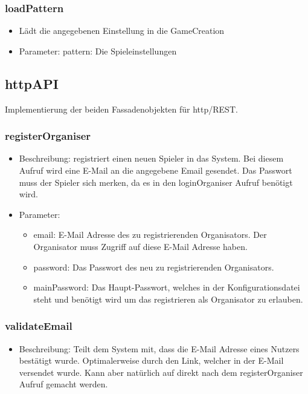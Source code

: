 \documentclass[a4paper]{scrreprt}
\begin{document}
	\subsubsection{loadPattern}
	\begin{itemize}
	\item Lädt die angegebenen Einstellung in die GameCreation
	\item Parameter: pattern: Die Spieleinstellungen
	\end{itemize}
	
   
    \subsection{httpAPI}
    Implementierung der beiden Fassadenobjekten für http/REST.

	\subsubsection{registerOrganiser}
	\begin{itemize}
		\item Beschreibung: registriert einen neuen Spieler in das System. Bei diesem Aufruf wird eine E-Mail an die angegebene Email gesendet. Das Passwort muss der Spieler sich merken, da es in den loginOrganiser Aufruf benötigt wird.
		\item Parameter:
		\begin{itemize}
			\item email: E-Mail Adresse des zu registrierenden Organisators. Der Organisator muss Zugriff auf diese E-Mail Adresse haben.
			\item password: Das Passwort des neu zu registrierenden Organisators.
			\item mainPassword: Das Haupt-Passwort, welches in der Konfigurationsdatei steht und benötigt wird um das registrieren als Organisator zu erlauben.
		\end{itemize}
	\end{itemize}
	\subsubsection{validateEmail}
	\begin{itemize}
		\item Beschreibung: Teilt dem System mit, dass die E-Mail Adresse eines Nutzers bestätigt wurde. Optimalerweise durch den Link, welcher in der E-Mail versendet wurde. Kann aber natürlich auf direkt nach dem registerOrganiser Aufruf gemacht werden.
	\end{itemize}
\end{document}
